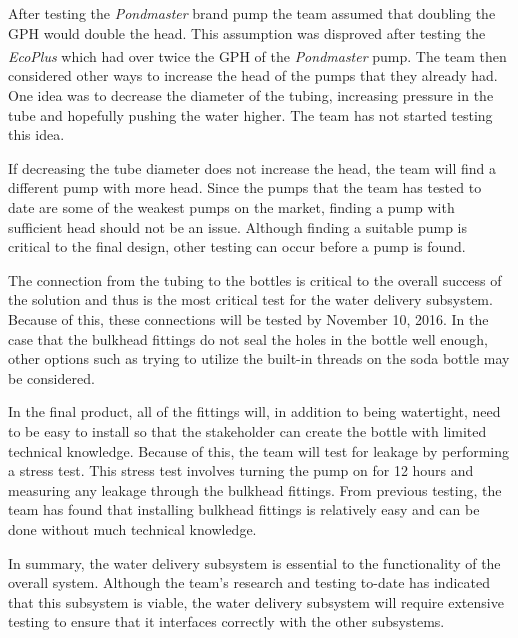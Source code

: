 \documentclass[12pt]{article}
\let\supscr=\textsuperscript
\begin{document}

After testing the \textit{Pondmaster} brand pump the team assumed that doubling the GPH would double
the head. This assumption was disproved after testing the \textit{EcoPlus\supscr{\textregistered}}
which had over twice the GPH of the \textit{Pondmaster} pump. The team then considered other ways to
increase the head of the pumps that they already had. One idea was to decrease the diameter of the
tubing, increasing pressure in the tube and hopefully pushing the water higher. The team has not
started testing this idea.

If decreasing the tube diameter does not increase the head, the team will find a different pump with
more head. Since the pumps that the team has tested to date are some of the weakest pumps on the
market, finding a pump with sufficient head should not be an issue. Although finding a suitable pump
is critical to the final design, other testing can occur before a pump is found.

The connection from the tubing to the bottles is critical to the overall success of the solution and
thus is the most critical test for the water delivery subsystem. Because of this, these connections
will be tested by November 10, 2016. In the case that the bulkhead fittings do not seal the holes in
the bottle well enough, other options such as trying to utilize the built-in threads on the soda
bottle may be considered.

In the final product, all of the fittings will, in addition to being watertight, need to be easy
to install so that the stakeholder can create the bottle with limited technical knowledge. Because
of this, the team will test for leakage by performing a stress test. This stress test involves
turning the pump on for 12 hours and measuring any leakage through the bulkhead fittings. From
previous testing, the team has found that installing bulkhead fittings is relatively easy and can be
done without much technical knowledge.

In summary, the water delivery subsystem is essential to the functionality of the overall system.
Although the team's research and testing to-date has indicated that this subsystem is viable, the
water delivery subsystem will require extensive testing to ensure that it interfaces correctly with
the other subsystems.
\end{document}

